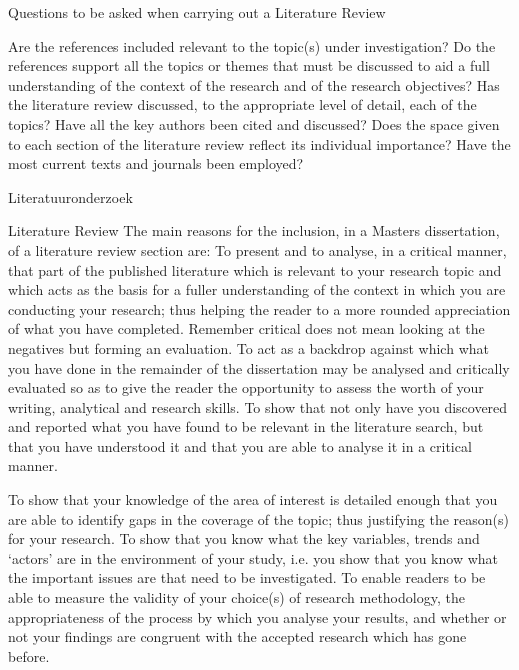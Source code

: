 			Questions to be asked when carrying out a Literature Review
			
			Are the references included relevant to the topic(s) under investigation?
			Do the references support all the topics or themes that must be discussed to aid a full understanding of the context of the research and  of  the research objectives?
			Has the literature review discussed, to the appropriate level of detail, each of the topics?
			Have all the key authors been cited and discussed?
			Does the space given to each section of the literature review reflect its individual importance?
			Have the most current texts and journals been employed?
			
			
			Literatuuronderzoek
			
			Literature Review
			The main reasons for the inclusion, in a Masters dissertation, of a literature review section are:
			To present and to analyse, in a critical manner, that part of the published literature which is relevant to your research topic and which acts as the basis for a fuller understanding of the context in which you are conducting your research; thus helping the reader to a more rounded appreciation of what you have completed. Remember critical does not mean looking at the negatives but forming an evaluation.
			To act as a backdrop against which what you have done in the remainder of the dissertation may be analysed and critically evaluated so as to give the reader the opportunity to assess the worth of your writing, analytical and research skills.
			To show that not only have you discovered and reported what you have found to be relevant in the literature search, but that you have understood it and that you are able to analyse it in a critical manner.
			
			To show that your knowledge of the area of interest is detailed enough that you are able to identify gaps in the coverage of the topic; thus justifying the reason(s) for your research.
			To show that you know what the key variables, trends and ‘actors’ are in the environment of your study, i.e. you show that you know what the important issues are that need to be investigated.
			To enable readers to be able to measure the validity of your choice(s) of research methodology, the appropriateness of the process by which you analyse your results, and whether or not your findings are congruent with the accepted research which has gone before.
			
